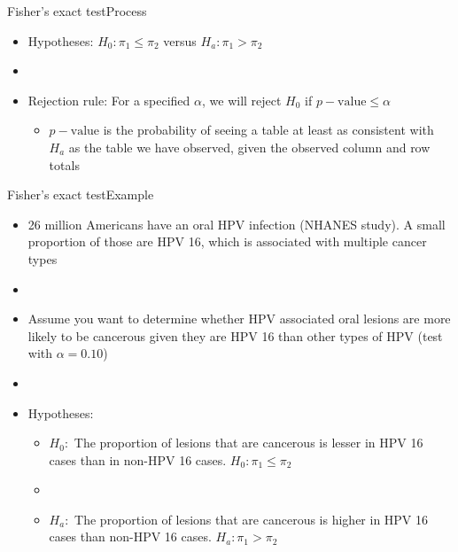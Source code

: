 \documentclass[xcolor=dvipsnames]{beamer}
\begin{document}
\begin{frame}{Fisher's exact test}{Process}
	\begin{itemize}
		\item Hypotheses: $H_0: \pi_1 \leq \pi_2$ versus $H_a: \pi_1 > \pi_2$  \pause
		\item[]
		\item Rejection rule: For a specified $\alpha$, we will reject $H_0$ if $p-\text{value} \leq \alpha$  \pause
		\begin{itemize}
			\item $p-\text{value}$ is the probability of seeing a table at least as consistent with $H_a$ as the table we have observed, given the observed column and row totals
		\end{itemize}
	\end{itemize}
\end{frame}

\begin{frame}{Fisher's exact test}{Example}
	\begin{itemize}
		\item 26 million Americans have an oral HPV infection (NHANES study). A small proportion of those are HPV 16, which is associated with multiple cancer types  \pause
		\item[]
		\item Assume you want to determine whether HPV associated oral lesions are more likely to be cancerous given they are HPV 16 than other types of HPV (test with $\alpha = 0.10$)  \pause
		\item[]
		\item Hypotheses:  \pause
		\begin{itemize}
			\item $H_0:$ The proportion of lesions that are cancerous is lesser in HPV 16 cases than in non-HPV 16 cases. $H_0: \pi_1 \leq \pi_2$  \pause
			\item[]
			\item $H_a:$ The proportion of lesions that are cancerous is higher in HPV 16 cases than non-HPV 16 cases. $H_a: \pi_1 > \pi_2$
		\end{itemize}
	\end{itemize}
\end{frame}
\end{document}
